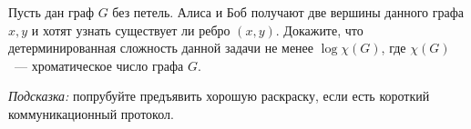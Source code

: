 Пусть дан граф $G$ без петель. Алиса и Боб получают две вершины данного графа $x, y$ и хотят узнать
существует ли ребро $(x, y)$. Докажите, что детерминированная сложность данной задачи не менее $\log
\chi(G)$, где $\chi(G)$~--- хроматическое число графа $G$.

\textit{Подсказка:} попрубуйте предъявить хорошую раскраску, если есть короткий коммуникационный протокол.
